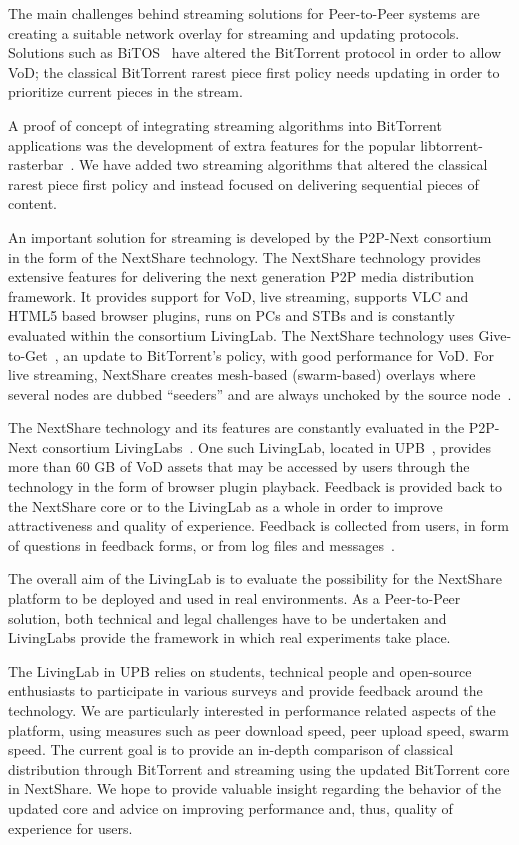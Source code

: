 The main challenges behind streaming solutions for Peer-to-Peer systems are
creating a suitable network overlay for streaming and updating protocols.
Solutions such as BiTOS~\cite{bitos} have altered the BitTorrent protocol in
order to allow VoD; the classical BitTorrent rarest piece first policy needs
updating in order to prioritize current pieces in the stream.

A proof of concept of integrating streaming algorithms into
BitTorrent applications was the development of extra features for the popular
libtorrent-rasterbar~\cite{libtorrent}. We have added two streaming algorithms that
altered the classical rarest piece first policy and instead focused on
delivering sequential pieces of content.

An important solution for streaming is developed by the P2P-Next
consortium~\cite{p2pnext} in the form of the NextShare technology. The NextShare
technology provides extensive features for delivering the next generation P2P
media distribution framework. It provides support for VoD, live streaming,
supports VLC and HTML5 based browser plugins, runs on PCs and STBs and is
constantly evaluated within the consortium LivingLab. The NextShare technology
uses Give-to-Get~\cite{give-to-get}, an update to BitTorrent's policy, with good
performance for VoD. For live streaming, NextShare creates mesh-based
(swarm-based) overlays where several nodes are dubbed ``seeders'' and are
always unchoked by the source node~\cite{design-p2p-live}.

The NextShare technology and its features are constantly evaluated in the
P2P-Next consortium LivingLabs~\cite{eu-livinglabs}. One such LivingLab, located in
UPB~\cite{upb-livinglab}, provides more than 60 GB of VoD assets that may be accessed
by users through the technology in the form of browser plugin playback.
Feedback is provided back to the NextShare core or to the LivingLab as a whole
in order to improve attractiveness and quality of experience. Feedback is
collected from users, in form of questions in feedback forms, or from log
files and messages~\cite{Deaconescu2011}.

The overall aim of the LivingLab is to evaluate the possibility for the
NextShare platform to be deployed and used in real environments. As a
Peer-to-Peer solution, both technical and legal challenges have to be
undertaken and LivingLabs provide the framework in which real experiments
take place.

The LivingLab in UPB relies on students, technical people and open-source
enthusiasts to participate in various surveys and provide feedback around the
technology. We are particularly interested in performance related aspects of
the platform, using measures such as peer download speed, peer upload speed,
swarm speed. The current goal is to provide an in-depth comparison of
classical distribution through BitTorrent and streaming using the updated
BitTorrent core in NextShare. We hope to provide valuable insight regarding
the behavior of the updated core and advice on improving performance and,
thus, quality of experience for users.
